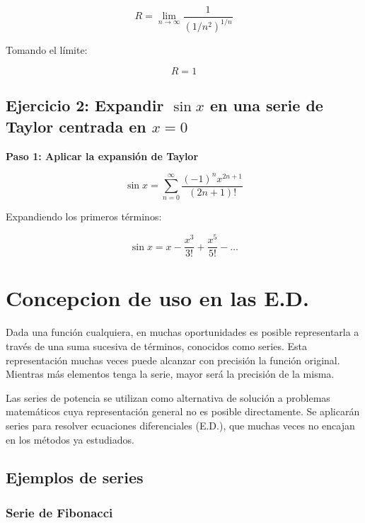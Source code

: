 \begin{equation}
R = \lim_{n \to \infty} \frac{1}{(1/n^2)^{1/n}}
\end{equation}

Tomando el límite:

\begin{equation}
R = 1
\end{equation}

\subsection*{Ejercicio 2: Expandir \( \sin x \) en una serie de Taylor centrada en \( x = 0 \)}
\textbf{Paso 1: Aplicar la expansión de Taylor}

\begin{equation}
\sin x = \sum_{n=0}^{\infty} \frac{(-1)^n x^{2n+1}}{(2n+1)!}
\end{equation}

Expandiendo los primeros términos:

\begin{equation}
\sin x = x - \frac{x^3}{3!} + \frac{x^5}{5!} - \dots
\end{equation}


\section{Concepcion de uso en las E.D.}

Dada una función cualquiera, en muchas oportunidades es posible representarla a través de una suma sucesiva de términos, conocidos como series. Esta representación muchas veces puede alcanzar con precisión la función original. Mientras más elementos tenga la serie, mayor será la precisión de la misma.

Las series de potencia se utilizan como alternativa de solución a problemas matemáticos cuya representación general no es posible directamente. Se aplicarán series para resolver ecuaciones diferenciales (E.D.), que muchas veces no encajan en los métodos ya estudiados.

\subsection{Ejemplos de series}

\subsubsection{Serie de Fibonacci}

